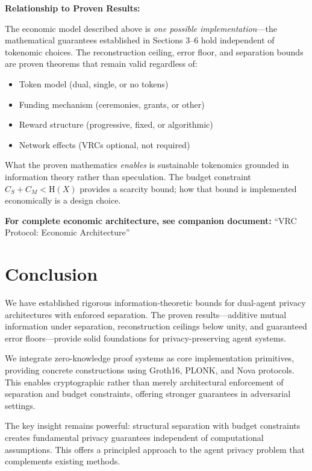 \documentclass[11pt,a4paper]{article}
\theoremstyle{definition}
\newcommand{\Entropy}{\mathrm{H}}
\begin{document}
\textbf{Relationship to Proven Results:}

The economic model described above is \textit{one possible implementation}---the mathematical guarantees established in Sections 3--6 hold independent of tokenomic choices. The reconstruction ceiling, error floor, and separation bounds are proven theorems that remain valid regardless of:

\begin{itemize}
    \item Token model (dual, single, or no tokens)
    \item Funding mechanism (ceremonies, grants, or other)
    \item Reward structure (progressive, fixed, or algorithmic)
    \item Network effects (VRCs optional, not required)
\end{itemize}

What the proven mathematics \textit{enables} is sustainable tokenomics grounded in information theory rather than speculation. The budget constraint $C_S + C_M < \Entropy(X)$ provides a scarcity bound; how that bound is implemented economically is a design choice.

\textbf{For complete economic architecture, see companion document:} ``VRC Protocol: Economic Architecture''

\section{Conclusion}

We have established rigorous information-theoretic bounds for dual-agent privacy architectures with enforced separation. The proven results---additive mutual information under separation, reconstruction ceilings below unity, and guaranteed error floors---provide solid foundations for privacy-preserving agent systems.

We integrate zero-knowledge proof systems as core implementation primitives, providing concrete constructions using Groth16, PLONK, and Nova protocols. This enables cryptographic rather than merely architectural enforcement of separation and budget constraints, offering stronger guarantees in adversarial settings.

The key insight remains powerful: structural separation with budget constraints creates fundamental privacy guarantees independent of computational assumptions. This offers a principled approach to the agent privacy problem that complements existing methods.
\end{document}
